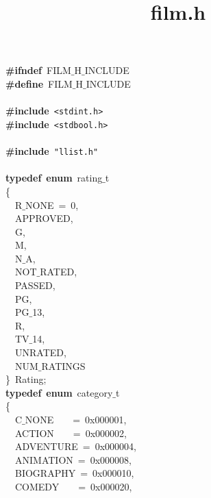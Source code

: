 \documentclass{article}
\title{film.h}
\date{}
\begin{document}
\maketitle

\noindent
\mbox{}\textbf{\#ifndef}\ FILM$\_$H$\_$INCLUDE \\
\mbox{}\textbf{\#define}\ FILM$\_$H$\_$INCLUDE \\
\mbox{} \\
\mbox{}\textbf{\#include}\ \texttt{\textless{}stdint.h\textgreater{}} \\
\mbox{}\textbf{\#include}\ \texttt{\textless{}stdbool.h\textgreater{}} \\
\mbox{} \\
\mbox{}\textbf{\#include}\ \texttt{"{}llist.h"{}} \\
\mbox{} \\
\mbox{}\textbf{typedef}\ \textbf{enum}\ rating$\_$t \\
\mbox{}\{ \\
\mbox{}\ \ R$\_$NONE\ =\ 0, \\
\mbox{}\ \ APPROVED, \\
\mbox{}\ \ G, \\
\mbox{}\ \ M, \\
\mbox{}\ \ N$\_$A, \\
\mbox{}\ \ NOT$\_$RATED, \\
\mbox{}\ \ PASSED, \\
\mbox{}\ \ PG, \\
\mbox{}\ \ PG$\_$13, \\
\mbox{}\ \ R, \\
\mbox{}\ \ TV$\_$14, \\
\mbox{}\ \ UNRATED, \\
\mbox{}\ \ NUM$\_$RATINGS \\
\mbox{}\}\ Rating; \\
\mbox{}\textbf{typedef}\ \textbf{enum}\ category$\_$t \\
\mbox{}\{ \\
\mbox{}\ \ C$\_$NONE\ \ \ \ =\ 0x000001, \\
\mbox{}\ \ ACTION\ \ \ \ =\ 0x000002, \\
\mbox{}\ \ ADVENTURE\ =\ 0x000004, \\
\mbox{}\ \ ANIMATION\ =\ 0x000008, \\
\mbox{}\ \ BIOGRAPHY\ =\ 0x000010, \\
\mbox{}\ \ COMEDY\ \ \ \ =\ 0x000020, \\
\end{document}
